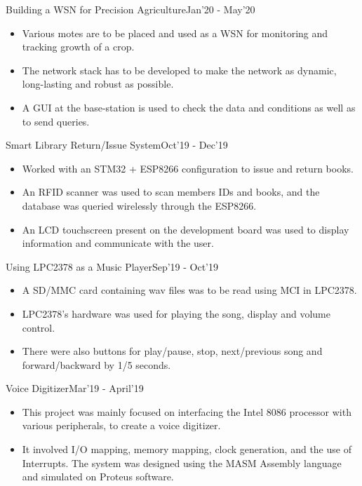 \begin{projects}

\project
	{Building a WSN for Precision Agriculture}{Jan'20 - May'20}
	{}
	{\begin{itemize}
	\setlength\itemsep{0.3em}
    \item Various motes are to be placed and used as a WSN for monitoring and tracking growth of a crop.
    \item The network stack has to be developed to make the network as dynamic, long-lasting and robust as possible.
    \item A GUI at the base-station is used to check the data and conditions as well as to send queries.
     \end{itemize}}
     
\project
	{Smart Library Return/Issue System}{Oct'19 - Dec'19}
	{}
	{\begin{itemize}
	\setlength\itemsep{0.3em}
    \item Worked with an STM32 + ESP8266 configuration to issue and return books.
    \item An RFID scanner was used to scan members IDs and books, and the database was queried wirelessly through the ESP8266.
    \item An LCD touchscreen  present on the development board was used to display information and communicate with the user.
     \end{itemize}}
     
\project
	{Using LPC2378 as a Music Player}{Sep'19 - Oct'19}
	{}
	{\begin{itemize}
	\setlength\itemsep{0.3em}
    \item A SD/MMC card containing wav files was to be read using MCI in LPC2378.
    \item LPC2378's hardware was used for playing the song, display and volume control.
    \item There were also buttons for play/pause, stop, next/previous song and forward/backward by 1/5 seconds.
     \end{itemize}}
     
\project
    {Voice Digitizer}{Mar'19 - April'19}
    {}
    {\begin{itemize}
	\setlength\itemsep{0.3em}
    \item This project was mainly focused on interfacing the Intel 8086 processor with various peripherals, to create a voice digitizer.
    \item It involved I/O mapping, memory mapping, clock generation, and the use of Interrupts. The system was designed using the MASM Assembly language and simulated on Proteus software.
     \end{itemize}}
 \end{projects}    
\vspace{-3mm}


